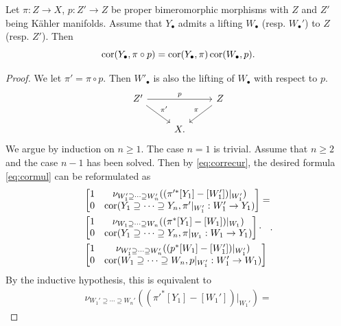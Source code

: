 \begin{proposition}\label{prop:cormult}
    Let $\pi\colon Z\rightarrow X$, $p\colon Z'\rightarrow Z$ be proper bimeromorphic morphisms with $Z$ and $Z'$ being Kähler manifolds.
    Assume that $Y_{\bullet}$ admits a lifting $W_{\bullet}$ (resp. $W_{\bullet}'$) to $Z$ (resp. $Z'$). Then
    \begin{equation}\label{eq:cormul}
    \operatorname{cor}(Y_{\bullet},\pi\circ p)=\operatorname{cor}(Y_{\bullet},\pi)\operatorname{cor}(W_{\bullet},p).
    \end{equation}
\end{proposition}
\begin{proof}
    We let $\pi'=\pi\circ p$.
    Then $W'_{\bullet}$ is also the lifting of $W_{\bullet}$ with respect to $p$.
    \[
    \begin{tikzcd}
Z' \arrow[rr, "p"] \arrow[rd, "\pi'"] &   & Z \arrow[ld, "\pi"'] \\
                                      & X. &
\end{tikzcd}
    \]
    We argue by induction on $n\geq 1$. The case $n=1$ is trivial. Assume that $n\geq 2$ and the case $n-1$ has been solved. Then by \eqref{eq:correcur}, the desired formula \eqref{eq:cormul} can be reformulated as
    \[
    \begin{aligned}
    &\begin{bmatrix}
    1 & \nu_{W_1'\supseteq \cdots \supseteq W_n'}((\pi'^*[Y_1]-[W_1'])|_{W_1'})\\
    0 & \operatorname{cor}(Y_1\supseteq \cdots \supseteq Y_n,\pi'|_{W_1'}:W_1'\rightarrow Y_1)
    \end{bmatrix}=\\
    &\begin{bmatrix}
    1 & \nu_{W_1\supseteq \cdots \supseteq W_n}((\pi^*[Y_1]-[W_1])|_{W_1})\\
    0 & \operatorname{cor}(Y_1\supseteq \cdots \supseteq Y_n,\pi|_{W_1}:W_1\rightarrow Y_1)
    \end{bmatrix}\cdot\\
    &\begin{bmatrix}
    1 & \nu_{W_1'\supseteq \cdots \supseteq W_n'}((p^*[W_1]-[W_1'])|_{W_1'})\\
    0 & \operatorname{cor}(W_1\supseteq \cdots \supseteq W_n,p|_{W_1'}:W_1'\rightarrow W_1)
    \end{bmatrix}
    \end{aligned}.
    \]
    By the inductive hypothesis, this is equivalent to
    \[
    \begin{split}
    \nu_{W_1'\supseteq \cdots \supseteq W_n'}\left((\pi'^*[Y_1]-[W_1'])|_{W_1'}\right)=

\end{split}\]
\end{proof}
